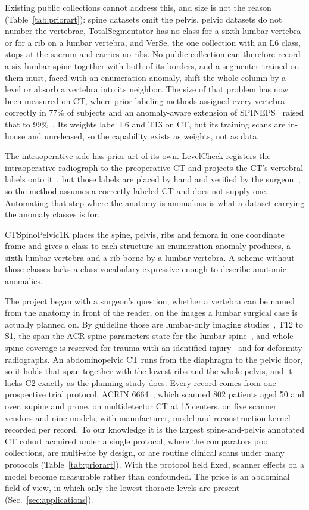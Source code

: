 \documentclass[aapm,mph,amsmath,amssymb,reprint]{revtex4-2}
\begin{document}
Existing public collections cannot address this, and size is not the reason
(Table~\ref{tab:priorart}): spine datasets omit the pelvis, pelvic datasets do not number
the vertebrae, TotalSegmentator has no class for a sixth lumbar vertebra or for a rib on a
lumbar vertebra, and VerSe, the one collection with an L6 class, stops at the sacrum and
carries no ribs. No public collection can therefore record a six-lumbar spine together with both of its
borders, and a segmenter trained on them must, faced with an enumeration anomaly, shift the
whole column by a level or absorb a vertebra into its neighbor. The size of that problem has now been measured
on CT, where prior labeling methods assigned every vertebra correctly in 77\% of subjects and
an anomaly-aware extension of SPINEPS~\cite{spineps2025} raised that to
99\%~\cite{veridah2026}. Its weights label L6 and T13 on CT, but its training scans are in-house and unreleased, so
the capability exists as weights, not as data. 

The intraoperative side has prior art of its own. LevelCheck registers the intraoperative
radiograph to the preoperative CT and projects the CT's vertebral labels onto
it~\cite{otake2012,lo2015,desilva2016}, but those labels are placed by hand and verified by
the surgeon~\cite{otake2012}, so the method assumes a correctly labeled CT and does not supply
one. Automating that step where the anatomy is anomalous is what a dataset carrying the
anomaly classes is for.

CTSpinoPelvic1K places the spine, pelvis, ribs and femora in one coordinate frame and gives
a class to each structure an enumeration anomaly produces, a sixth lumbar vertebra and a rib borne by a lumbar vertebra. A scheme without those classes lacks a class vocabulary
expressive enough to describe anatomic anomalies.

The project began with a surgeon's question, whether a vertebra can be named from the anatomy in front of the reader, on the images a lumbar surgical case is actually planned on. By guideline those are lumbar-only imaging studies~\cite{acr2021,nass2013,acrct2022}, T12 to S1, the span the ACR spine parameters state for the lumbar spine~\cite{acrmri2023}, and whole-spine
coverage is reserved for trauma with an identified injury~\cite{tqip2018} and for deformity
radiographs. An abdominopelvic CT runs from the diaphragm to the pelvic floor, so it holds
that span together with the lowest ribs and the whole pelvis, and it lacks C2 exactly as the
planning study does. Every record
comes from one prospective trial protocol, ACRIN 6664~\cite{colonog,tcia}, which scanned 802 patients aged 50 and over, supine and prone, on multidetector CT at 15 centers, on five scanner
vendors and nine models, with manufacturer, model and reconstruction kernel recorded per
record. To our knowledge it is the largest spine-and-pelvis annotated CT cohort acquired under a
single protocol, where the comparators pool collections, are multi-site by design, or are
routine clinical scans under many protocols (Table~\ref{tab:priorart}). With the protocol
held fixed, scanner effects on a model become measurable rather than confounded. The price
is an abdominal field of view, in which only the lowest thoracic levels are present
(Sec.~\ref{sec:applications}).
\end{document}
